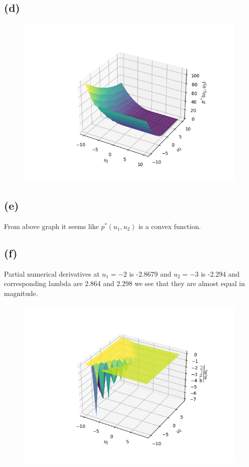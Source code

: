 \documentclass{article}
\begin{document}
\subsection*{(d)}
\begin{figure}[H]
	\includegraphics[scale=1]{./figs/p.png}
\end{figure}
\subsection*{(e)}
From above graph it seems like $p^*(u_1, u_2)$ is a convex function.
\subsection*{(f)}
Partial numerical derivatives at $u_1 = -2$ is -2.8679 and $u_2 = -3$ is -2.294 and corresponding lambda are 2.864 and 2.298 we see that they are almost equal in magnitude.
\begin{figure}[H]
	\includegraphics[scale=1]{./figs/p_dash.png}
\end{figure}
\end{document}
